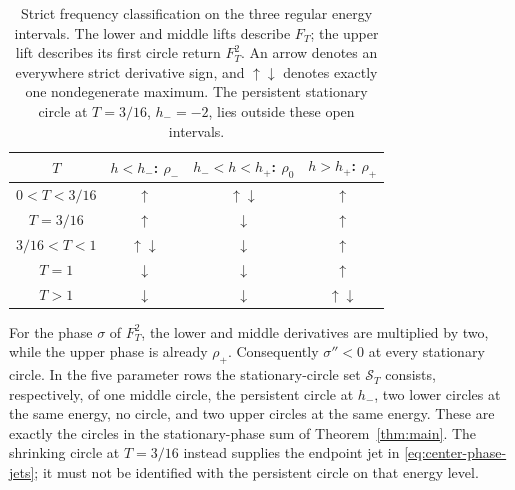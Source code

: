 \begin{table}[htbp]
\centering
\begin{tabular}{c c c c}
\toprule
$T$ & $h<h_-$: $\rho_-$ & $h_-<h<h_+$: $\rho_0$
    & $h>h_+$: $\rho_+$\\
\midrule
$0<T<3/16$ & $\uparrow$ & $\uparrow\downarrow$ & $\uparrow$\\
$T=3/16$ & $\uparrow$ & $\downarrow$ & $\uparrow$\\
$3/16<T<1$ & $\uparrow\downarrow$ & $\downarrow$ & $\uparrow$\\
$T=1$ & $\downarrow$ & $\downarrow$ & $\uparrow$\\
$T>1$ & $\downarrow$ & $\downarrow$ & $\uparrow\downarrow$\\
\bottomrule
\end{tabular}
\caption{Strict frequency classification on the three regular energy
intervals.  The lower and middle lifts describe $F_T$; the upper lift
describes its first circle return $F_T^2$.  An arrow denotes an
everywhere strict derivative sign, and $\uparrow\downarrow$ denotes
exactly one nondegenerate maximum.  The persistent stationary circle
at $T=3/16$, $h_-=-2$, lies outside these open intervals.}
\label{freq:classification-table}
\end{table}

For the phase $\sigma$ of $F_T^2$, the lower and middle derivatives
are multiplied by two, while the upper phase is already $\rho_+$.
Consequently $\sigma''<0$ at every stationary circle.  In the five
parameter rows the stationary-circle set $\mathcal S_T$ consists,
respectively, of one middle circle, the persistent circle at $h_-$,
two lower circles at the same energy, no circle, and two upper
circles at the same energy.  These are exactly the circles in the
stationary-phase sum of Theorem~\ref{thm:main}.  The shrinking circle
at $T=3/16$ instead supplies the endpoint jet in
\eqref{eq:center-phase-jets}; it must not be identified with the
persistent circle on that energy level.
